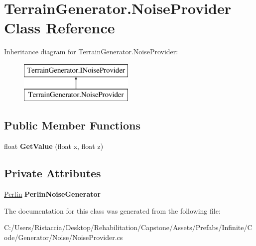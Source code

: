 \hypertarget{class_terrain_generator_1_1_noise_provider}{}\section{Terrain\+Generator.\+Noise\+Provider Class Reference}
\label{class_terrain_generator_1_1_noise_provider}
Inheritance diagram for Terrain\+Generator.\+Noise\+Provider\+:\begin{figure}[H]
\begin{center}
\leavevmode
\includegraphics[height=2.000000cm]{class_terrain_generator_1_1_noise_provider}
\end{center}
\end{figure}
\subsection*{Public Member Functions}
\begin{DoxyCompactItemize}
\item 
\mbox{\label{class_terrain_generator_1_1_noise_provider_adaaee097f189c5b1b3b7b17bfbf5cbfc}} 
float {\bfseries Get\+Value} (float x, float z)
\end{DoxyCompactItemize}
\subsection*{Private Attributes}
\begin{DoxyCompactItemize}
\item 
\mbox{\label{class_terrain_generator_1_1_noise_provider_a01e8d48924e114796a84c4859e84f9cf}} 
\hyperlink{class_lib_noise_1_1_generator_1_1_perlin}{Perlin} {\bfseries Perlin\+Noise\+Generator}
\end{DoxyCompactItemize}


The documentation for this class was generated from the following file\+:\begin{DoxyCompactItemize}
\item 
C\+:/\+Users/\+Ristaccia/\+Desktop/\+Rehabilitation/\+Capstone/\+Assets/\+Prefabs/\+Infinite/\+Code/\+Generator/\+Noise/Noise\+Provider.\+cs\end{DoxyCompactItemize}
